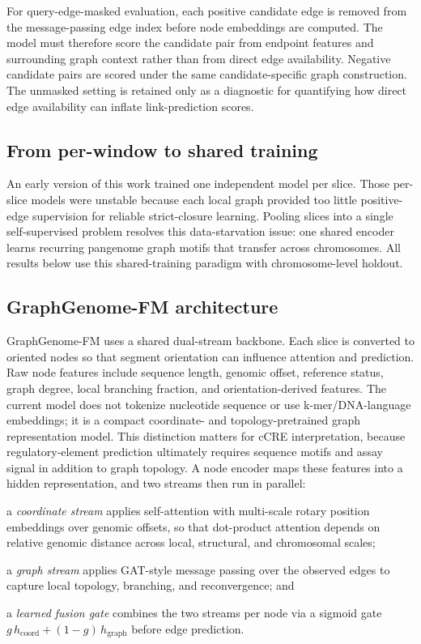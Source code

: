\IfFileExists{ws-procs11x85.cls}{\worldscientificclasstrue\documentclass{ws-procs11x85}}{\worldscientificclassfalse\documentclass[11pt]{article}\usepackage[margin=1in]{geometry}}
\begin{document}
For query-edge-masked evaluation, each positive candidate edge is removed from
the message-passing edge index before node embeddings are computed. The model
must therefore score the candidate pair from endpoint features and surrounding
graph context rather than from direct edge availability. Negative candidate
pairs are scored under the same candidate-specific graph construction. The
unmasked setting is retained only as a diagnostic for quantifying how direct
edge availability can inflate link-prediction scores.

\subsection{From per-window to shared training}
\label{sec:shared}

An early version of this work trained one independent model per slice. Those
per-slice models were unstable because each local graph provided too little
positive-edge supervision for reliable strict-closure learning. Pooling slices
into a single self-supervised problem resolves this data-starvation issue: one
shared encoder learns recurring pangenome graph motifs that transfer across
chromosomes. All results below use this shared-training paradigm with
chromosome-level holdout.

\subsection{GraphGenome-FM architecture}

GraphGenome-FM uses a shared dual-stream backbone. Each slice is converted to oriented nodes so
that segment orientation can influence attention and prediction. Raw node
features include sequence length, genomic offset, reference status, graph
degree, local branching fraction, and orientation-derived features. The current
model does not tokenize nucleotide sequence or use k-mer/DNA-language
embeddings; it is a compact coordinate- and topology-pretrained graph
representation model. This distinction matters for cCRE interpretation, because
regulatory-element prediction ultimately requires sequence motifs and assay
signal in addition to graph topology. A node encoder maps these features into a
hidden representation, and two streams then run in parallel:

\begin{itemlist}
\item a \emph{coordinate stream} applies self-attention with multi-scale rotary
position embeddings over genomic offsets, so that dot-product attention depends
on relative genomic distance across local, structural, and chromosomal scales;
\item a \emph{graph stream} applies GAT-style message passing over the observed
edges to capture local topology, branching, and reconvergence; and
\item a \emph{learned fusion gate} combines the two streams per node via a
sigmoid gate $g\,h_{\mathrm{coord}}+(1-g)\,h_{\mathrm{graph}}$ before edge
prediction.
\end{itemlist}
\end{document}
